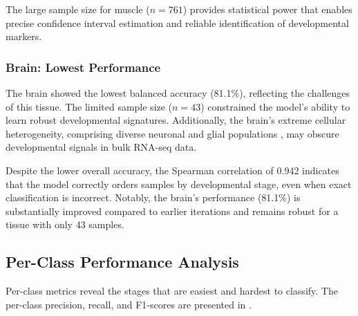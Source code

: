 The large sample size for muscle ($n = 761$) provides statistical power that enables precise confidence interval estimation and reliable identification of developmental markers.

\subsubsection{Brain: Lowest Performance}

The brain showed the lowest balanced accuracy (81.1\%), reflecting the challenges of this tissue. The limited sample size ($n = 43$) constrained the model's ability to learn robust developmental signatures. Additionally, the brain's extreme cellular heterogeneity, comprising diverse neuronal and glial populations \parencite{jiang_cellular_2016}, may obscure developmental signals in bulk RNA-seq data.

Despite the lower overall accuracy, the Spearman correlation of 0.942 indicates that the model correctly orders samples by developmental stage, even when exact classification is incorrect. Notably, the brain's performance (81.1\%) is substantially improved compared to earlier iterations and remains robust for a tissue with only 43 samples.

\subsection{Per-Class Performance Analysis}

Per-class metrics reveal the stages that are easiest and hardest to classify. The per-class precision, recall, and F1-scores are presented in .

